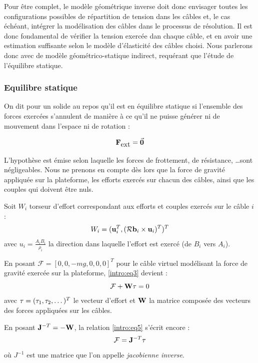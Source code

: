Pour être complet, le modèle géométrique inverse doit donc envisager toutes les configurations possibles de répartition de tension dans les câbles et, le cas échéant, intégrer la modélisation des câbles dans le processus de résolution. Il est donc fondamental de vérifier la tension exercée dan chaque câble, et en avoir une estimation suffisante selon le modèle d'élasticité des câbles choisi. Nous parlerons donc avec \cite{Carricato-2010-06b} de modèle géométrico-statique indirect, requérant que l'étude de l'équilibre statique.

\subsubsection{Equilibre statique}

On dit pour un solide au repos qu'il est en équilibre statique si l'ensemble des forces exercées s'annulent de manière à ce qu'il ne puisse générer ni de mouvement dans l'espace ni de rotation :

\begin{equation}
\mathcal {\bf F}_{\hbox{ext}} = \vec {\bf 0}
\label{intro:eq2}
\end{equation}

L'hypothèse est émise selon laquelle les forces de frottement, de résistance, \dots sont négligeables. Nous ne prenons en compte dès lors que la force de gravité appliquée sur la plateforme, les efforts exercés sur chacun des câbles, ainsi que les couples qui doivent être nuls.

Soit $W_i$ torseur d'effort correspondant aux efforts et couples exercés sur le câble $i$ :
\begin{equation}
W_i = ({\bf u}_i^T, (\mathcal R {\bf b}_i \times {\bf u}_i)^T)^T
\label{intro:eq3}
\end{equation}
avec $u_i = \frac{A_iB_i}{\rho_i}$ la direction dans laquelle l'effort est exercé (de $B_i$ vers $A_i$).

En posant $\mathcal F = [0, 0, -mg, 0, 0, 0]^T$ pour le câble virtuel modélisant la force de gravité exercée sur la plateforme, \ref{intro:eq3} devient :
\begin{equation}
\mathcal F + {\bf W} {\bf \tau} = 0
\label{intro:eq4}
\end{equation}
avec ${\bf \tau} = (\tau_1, \tau_2, \dots)^T$ le vecteur d'effort et ${\bf W}$ la matrice composée des vecteurs des forces appliquées sur les câbles.

En posant ${\bf J}^{-T} = - {\bf W}$, la relation \ref{intro:eq5} s'écrit encore :
\begin{equation}
\mathcal F = {\bf J}^{-T} {\bf \tau}
\label{intro:eq5}
\end{equation}
où $J^{-1}$ est une matrice que l'on appelle {\it jacobienne inverse}.

